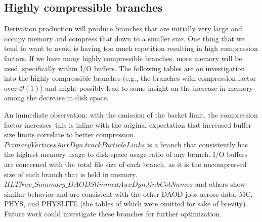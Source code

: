 






\subsection{Highly compressible branches}

Derivation production will produce branches that are initially very large and occupy memory and compress that down to a smaller size.
One thing that we tend to want to avoid is having too much repetition resulting in high compression factors.
If we have many highly compressible branches, more memory will be used, specifically within I/O buffers.
The following tables are an investigation into the highly compressible branches (e.g., the branches with compression factor over $\mathcal{O}(1)$) and might possibly lead to some insight on the increase in memory among the decrease in disk space.

% 
% 
% 
% 
% 
% 
% 
% 
% 






An immediate observation: with the omission of the basket limit, the compression factor increases--this is inline with the original expectation that increased buffer size limits correlate to better compression. 
$\textit{PrimaryVerticesAuxDyn.trackParticleLinks}$ is a branch that consistently has the highest memory usage to disk-space usage ratio of any branch.
I/O buffers are concerned with the total file size of each branch, as it is the uncompressed size of each branch that is held in memory. 
$\textit{HLTNav\_Summary\_DAODSlimmedAuxDyn.linkColNames}$ and others show similar behavior and are consistent with the other DAOD jobs across data, MC, PHYS, and PHYSLITE (the tables of which were omitted for sake of brevity).
Future work could investigate these branches for further optimization.